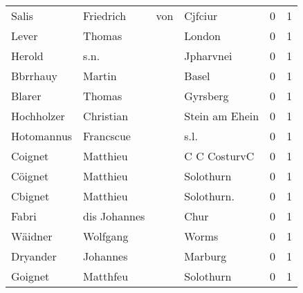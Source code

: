 \begin{tabular}{llllrr}
                    Salis &                          Friedrich &         von &                                     Cjfciur &          0 &         1 \\
                    Lever &                             Thomas &             &                                      London &          0 &         1 \\
                   Herold &                               s.n. &             &                                   Jpharvnei &          0 &         1 \\
                 Bbrrhauy &                             Martin &             &                                       Basel &          0 &         1 \\
                   Blarer &                             Thomas &             &                                    Gyrsberg &          0 &         1 \\
               Hochholzer &                          Christian &             &                              Stein am Ehein &          0 &         1 \\
               Hotomannus &                          Francscue &             &                                        s.l. &          0 &         1 \\
                  Coignet &                           Matthieu &             &                                C C CosturvC &          0 &         1 \\
                  Cöignet &                           Matthieu &             &                                   Solothurn &          0 &         1 \\
                  Cbignet &                           Matthieu &             &                                 Solothurn.  &          0 &         1 \\
                    Fabri &                       dis Johannes &             &                                        Chur &          0 &         1 \\
                  Wäidner &                           Wolfgang &             &                                       Worms &          0 &         1 \\
                 Dryander &                           Johannes &             &                                     Marburg &          0 &         1 \\
                  Goignet &                           Matthfeu &             &                                   Solothurn &          0 &         1 \\

\end{tabular}

